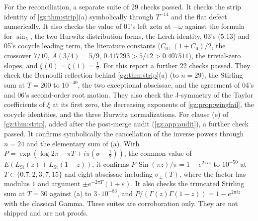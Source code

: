 \documentclass[11pt,a4paper]{article}
\numberwithin{equation}{section}
\theoremstyle{definition}
\theoremstyle{remark}
\newcommand{\eps}{\varepsilon}
\newcommand{\Sin}{\operatorname{Sin}}
\newcommand{\LSt}{L_{\mathrm{St}}}
\begin{document}
For the reconciliation, a separate suite of 29 checks passed. It checks the
strip identity of \cref{gz:thm:strip}(a) symbolically through $T^{-14}$ and the
flat defect numerically. It also checks the value of 01's left zeta at
$-\omega$ against the formula for $\sin_\lambda$, the two Hurwitz distribution
forms, the Lerch identity, 03's (5.13) and 05's cocycle leading term, the
literature constants ($C_0$, $(1+C_0)/2$, the crossover $7/10$, $A(3/4)=5/9$,
$0.417293>5/12>0.407511$), the trivial-zero slopes, and $\xi(0)=\xi(1)=\tfrac12$.
For this report a further 22 checks passed. They check the Bernoulli
reflection behind \cref{gz:thm:strip}(a) (to $n=29$), the Stirling sum at
$T=200$ to $10^{-40}$, the two exceptional abscissae, and the agreement of
04's and 06's second-order root motion. They also check the J-symmetry of the
Taylor coefficients of $\xi$ at its first zero, the decreasing exponents of
\cref{gz:prop:wingfail}, the cocycle identities, and the three Hurwitz
normalizations. For clause (e) of \cref{gz:thm:strip}, added after the
post-merge audit (\cref{gz:app:audit}), a further check passed. It confirms
symbolically the cancellation of the inverse powers through $n=24$ and the
elementary sum of (a). With $P=\exp(\log2\pi-\pi T+i\pi(\sigma-\tfrac12))$,
the common value of $E(\LSt(z)+\LSt(1-z))$, it confirms
$P\,\Sin(\pi z)/\pi=1-e^{2\pi iz}$ to $10^{-50}$ at $T\in\{0.7,2,3,7,15\}$
and eight abscissae including $\sigma_\pm(T)$, where the factor has modulus
$1$ and argument $\pm e^{-2\pi T}(1+\eps)$. It also checks the truncated
Stirling sum at $T=30$ against (a) to $3\cdot10^{-83}$, and
$P/(\Gamma(z)\Gamma(1-z))=1-e^{2\pi iz}$ with the classical Gamma. These
suites are corroboration only. They are not shipped and are not proofs.
\end{document}
